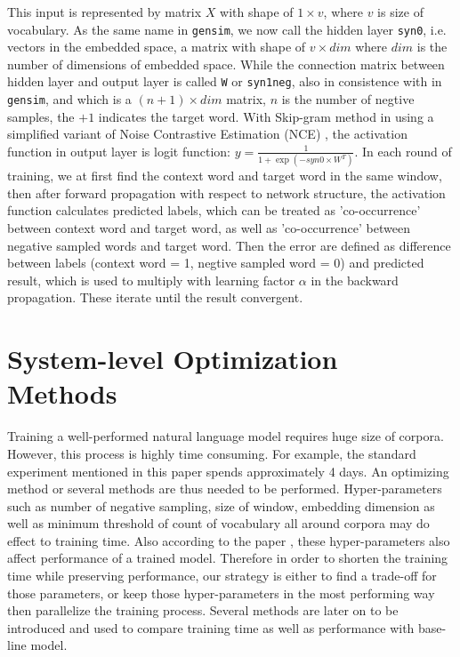 \documentclass[11pt,a4paper]{article}
\begin{document}
This input is represented by matrix $X$ with shape of $1\times v$, where $v$ is size of vocabulary. As the same name in \verb|gensim|, we now call the hidden layer \verb|syn0|, i.e. vectors in the embedded space, a matrix with shape of $v\times dim$ where $dim$ is the number of dimensions of embedded space. While the connection matrix between hidden layer and output layer is called \verb|W| or \verb|syn1neg|, also in consistence with in \verb|gensim|, and which is a $(n+1)\times dim$ matrix, $n$ is the number of negtive samples, the $+1$ indicates the target word. With Skip-gram method in \cite{mikolov2013distributed} using a simplified variant of Noise Contrastive Estimation (NCE) \cite{gutmann2012noise}, the activation function in output layer is logit function: $y=\frac{1}{1+\exp(-syn0\times W^T)}$. In each round of training, we at first find the context word and target word in the same window, then after forward propagation with respect to network structure, the activation function calculates predicted labels, which can be treated as 'co-occurrence' between context word and target word, as well as 'co-occurrence' between negative sampled words and target word. Then the error are defined as difference between labels (context word = 1, negtive sampled word = 0) and predicted result, which is used to multiply with learning factor $\alpha$ in the backward propagation. These iterate until the result convergent.

\section{System-level Optimization Methods}
Training a well-performed natural language model requires huge size of corpora. However, this process is highly time consuming. For example, the standard experiment mentioned in this paper spends approximately 4 days. An optimizing method or several methods are thus needed to be performed. Hyper-parameters such as number of negative sampling, size of window, embedding dimension as well as minimum threshold of count of vocabulary all around corpora may do effect to training time. Also according to the paper \cite{levy2015improving}, these hyper-parameters also affect performance of a trained model. Therefore in order to shorten the training time while preserving performance, our strategy is either to find a trade-off for those parameters, or keep those hyper-parameters in the most performing way then parallelize the training process. Several methods are later on to be introduced and used to compare training time as well as performance with base-line model.
\end{document}
